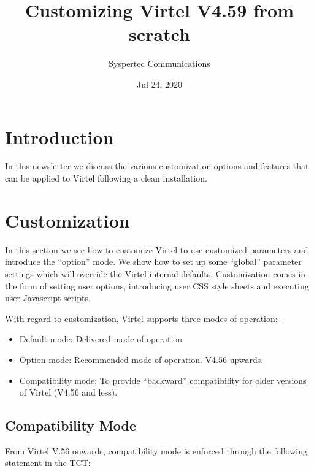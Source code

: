 \documentclass[letterpaper,10pt,english]{sphinxmanual}
\title{Customizing Virtel V4.59 from scratch}
\date{Jul 24, 2020}
\author{Syspertec Communications}
\begin{document}
\pagestyle{empty}
\sphinxmaketitle
\pagestyle{plain}
\sphinxtableofcontents
\pagestyle{normal}
\label{\detokenize{TN202002::doc}}



\chapter{Introduction}
\label{\detokenize{TN202002:introduction}}
In this newsletter we discuss the various customization options and features that can be applied to Virtel following a clean installation.


\chapter{Customization}
\label{\detokenize{TN202002:customization}}
In this section we see how to customize Virtel to use customized parameters and introduce the “option” mode. We show how to set up some “global” parameter settings which will override the Virtel internal defaults. Customization comes in the form of setting user options, introducing user CSS style sheets and executing user Javascript scripts.

With regard to customization, Virtel supports three modes of operation: -
\begin{itemize}
\item {} 
Default mode:      Delivered mode of operation

\item {} 
Option mode:       Recommended mode of operation. V4.56 upwards.

\item {} 
Compatibility mode:  To provide “backward” compatibility for older versions of Virtel (V4.56 and less).

\end{itemize}


\section{Compatibility Mode}
\label{\detokenize{TN202002:compatibility-mode}}
From Virtel V.56 onwards, compatibility mode is enforced through the following statement in the TCT:-

\begin{sphinxVerbatim}[commandchars=\\\{\}]
                  
\end{sphinxVerbatim}
\end{document}
